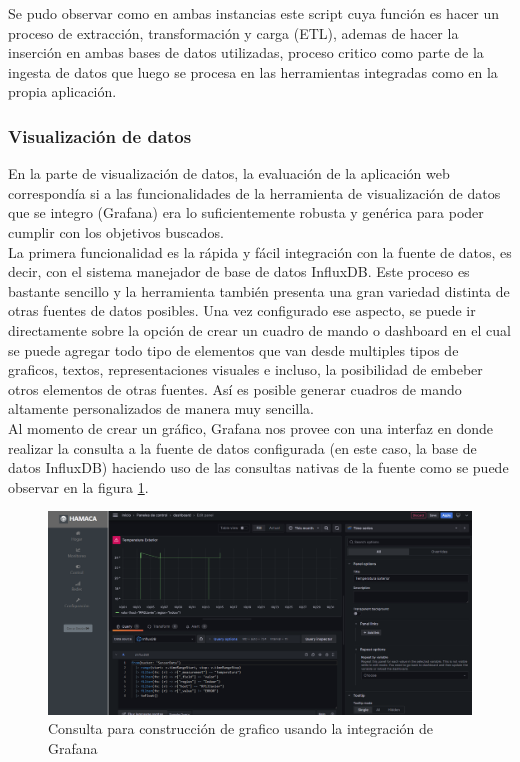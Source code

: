 Se pudo observar como en ambas instancias este script cuya función es hacer un proceso de extracción, transformación y carga (ETL), ademas de hacer la inserción en ambas bases de datos utilizadas, proceso critico como parte de la ingesta de datos que luego se procesa en las herramientas integradas como en la propia aplicación. 

\subsubsection{Visualización de datos}
En la parte de visualización de datos, la evaluación de la aplicación web correspondía si a las funcionalidades de la herramienta de visualización de datos que se integro (Grafana) era lo suficientemente robusta y genérica para poder cumplir con los objetivos buscados.\\

La primera funcionalidad es la rápida y fácil integración con la fuente de datos, es decir, con el sistema manejador de base de datos InfluxDB. Este proceso es bastante sencillo y la herramienta también presenta una gran variedad distinta de otras fuentes de datos posibles. Una vez configurado ese aspecto, se puede ir directamente sobre la opción de crear un cuadro de mando o dashboard en el cual se puede agregar todo tipo de elementos que van desde multiples tipos de graficos, textos, representaciones visuales e incluso, la posibilidad de embeber otros elementos de otras fuentes. Así es posible generar cuadros de mando altamente personalizados de manera muy sencilla.\\

Al momento de crear un gráfico, Grafana nos provee con una interfaz en donde realizar la consulta a la fuente de datos configurada (en este caso, la base de datos InfluxDB) haciendo uso de las consultas nativas de la fuente como se puede observar en la figura \ref{fig:consulta_grafana}.\\
\begin{figure}[htb]
\centering
\includegraphics[scale=0.225]{./Figuras/consulta_grafana.png}
\caption{Consulta para construcción de grafico usando la integración de Grafana}
\label{fig:consulta_grafana}
\vspace*{-10pt}
\end{figure}

